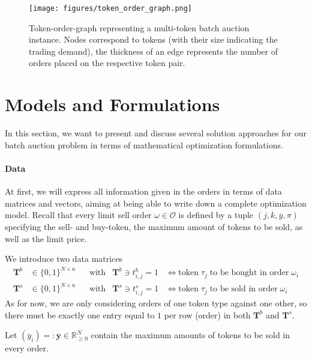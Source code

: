 \documentclass[11pt,parskip=full]{scrartcl}%
\newcommand*{\orders}{\mathcal{O}}          %
\begin{document}
\begin{figure}[h!]
  \centering
  \texttt{[image: figures/token\_order\_graph.png]}
  \caption{Token-order-graph representing a multi-token batch auction instance. Nodes correspond
  to tokens (with their size indicating the trading demand), the thickness of an edge represents 
  the number of orders placed on the respective token pair.}
  \label{fig:order-token-graph}
\end{figure}


\clearpage
\section{Models and Formulations}
\label{sec:models}

In this section, we want to present and discuss several solution approaches for our batch auction
problem in terms of mathematical optimization formulations.

\vspace{-.2cm}
\paragraph{Data}

At first, we will express all information given in the orders in terms of data matrices and
vectors, aiming at being able to write down a complete optimization model.
Recall that every limit sell order $ \omega \in \orders $ is defined by a tuple
$ (j,k,\overline{y},\pi) $ specifying the sell- and buy-token, the maximum amount of
tokens to be sold, as well as the limit price.

We introduce two data matrices
\begin{align*}
  \mathbf{T}^b &\in \{0,1\}^{N \times n} && \text{with} & \mathbf{T}^b \ni t^b_{i,j} = 1
  &\Leftrightarrow
  \text{token} \; \tau_j \; \text{to be bought in order} \; \omega_i \\
  \mathbf{T}^s &\in \{0,1\}^{N \times n} && \text{with} & \mathbf{T}^s \ni t^s_{i,j} = 1
  &\Leftrightarrow
  \text{token} \; \tau_j \; \text{to be sold in order} \; \omega_i
\end{align*}
As for now, we are only considering orders of one token type against one other, so there must be
exactly one entry equal to $ 1 $ per row (order) in both $ \mathbf{T}^b $ and $ \mathbf{T}^s $.

Let $ (\overline{y}_i) =: \overline{\mathbf{y}} \in \mathbb{R}^N_{\ge 0} $
contain the maximum amounts of tokens to be sold in every order.
\end{document}

